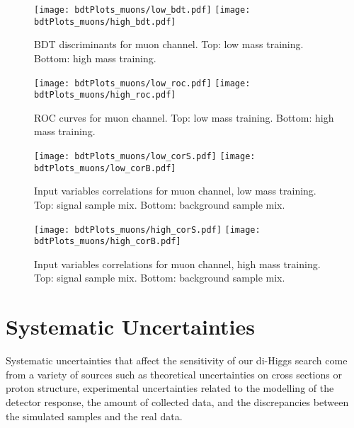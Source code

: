 \begin{figure}[tbp]
  \begin{center}
   \texttt{[image: bdtPlots\_muons/low\_bdt.pdf]}
   \texttt{[image: bdtPlots\_muons/high\_bdt.pdf]}
    \caption{ BDT discriminants for muon channel. Top: low mass training. Bottom: high mass training. }
    \label{fig:muon_BDTs}
  \end{center}
\end{figure}

\begin{figure}[tbp]
  \begin{center}
   \texttt{[image: bdtPlots\_muons/low\_roc.pdf]}
   \texttt{[image: bdtPlots\_muons/high\_roc.pdf]}
    \caption{ ROC curves for muon channel. Top: low mass training. Bottom: high mass training. }
    \label{fig:muon_ROCs}
  \end{center}
\end{figure}

\begin{figure}[tbp]
  \begin{center}
   \texttt{[image: bdtPlots\_muons/low\_corS.pdf]}
   \texttt{[image: bdtPlots\_muons/low\_corB.pdf]}
    \caption{ Input variables correlations for muon channel, low mass training. Top: signal sample mix. Bottom: background sample mix. }
    \label{fig:muon_cors_low}
  \end{center}
\end{figure}


\begin{figure}[tbp]
  \begin{center}
   \texttt{[image: bdtPlots\_muons/high\_corS.pdf]}
   \texttt{[image: bdtPlots\_muons/high\_corB.pdf]}
    \caption{ Input variables correlations for muon channel, high mass training. Top: signal sample mix. Bottom: background sample mix. }
    \label{fig:muon_cors_high}
  \end{center}
\end{figure}



\section{Systematic Uncertainties}
\label{sec:Systematics}

Systematic uncertainties that affect the sensitivity of our di-Higgs search
come from a variety of sources such as theoretical uncertainties on
cross sections or proton structure, experimental uncertainties related
to the modelling of the detector response, the amount of collected
data, and the discrepancies between the simulated samples and the real data.

